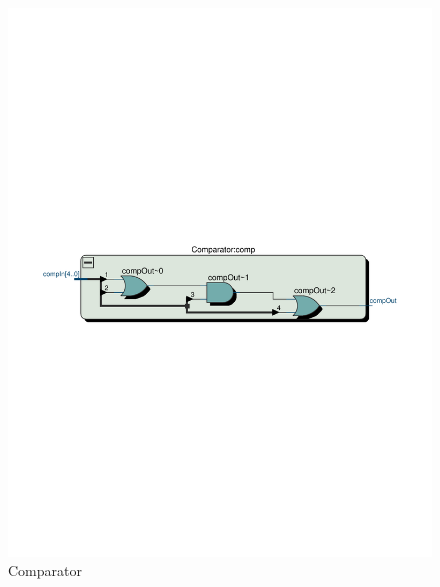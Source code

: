 \documentclass[13pt,a4paper]{report}
\begin{document}
\begin{figure}[H]
\centering
\includegraphics[scale=0.7, clip, trim={0cm 12cm 0cm 12.6cm}]{images/Exc2_Comparator_RTL.pdf}
\caption*{Comparator}
\end{figure}
\end{document}
